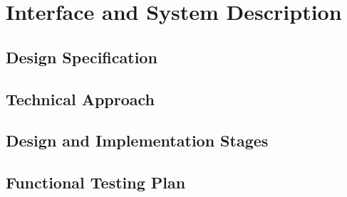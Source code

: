 \chapter{Interface and System Description}

\section{Design Specification}

\section{Technical Approach}

\section{Design and Implementation Stages}

\section{Functional Testing Plan}
